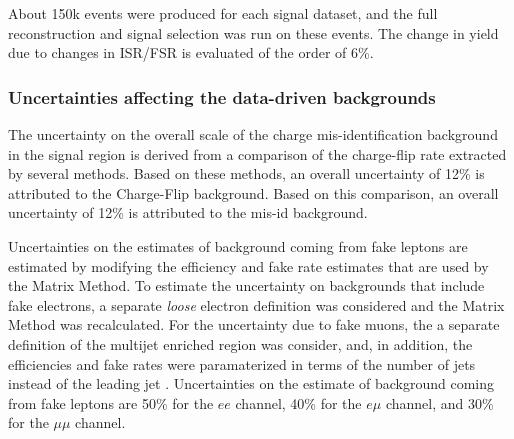 About 150k events were produced for each signal dataset, and the full reconstruction and signal selection was run on these events.
The change in yield due to changes in ISR/FSR is evaluated of the order of 6\%.


\subsubsection{Uncertainties affecting the data-driven backgrounds}
The uncertainty on the overall scale of the charge mis-identification background in the signal region is derived from a comparison of the charge-flip rate extracted by several methods.
Based on these methods, an overall uncertainty of 12\% is attributed to the Charge-Flip background.
Based on this comparison, an overall uncertainty of 12\% is attributed to the mis-id background.

Uncertainties on the estimates of background coming from fake leptons are estimated by modifying the efficiency and fake rate estimates that
are used by the Matrix Method.
To estimate the uncertainty on backgrounds that include fake electrons, a separate {\it loose} electron definition was considered and the Matrix Method was recalculated.
For the uncertainty due to fake muons, the a separate definition of the multijet enriched region was consider, and, in addition, the efficiencies and fake rates were paramaterized in terms of the number of jets instead of the leading jet \pT{}.
Uncertainties on the estimate of background coming from fake leptons are 50\% for the $ee$ channel, 40\% for the $e\mu$ channel, and 30\% for the $\mu\mu$ channel.


